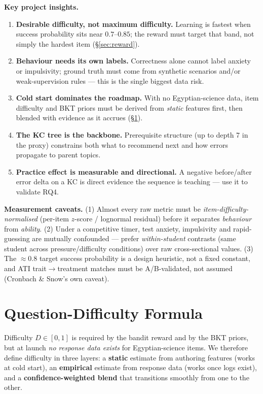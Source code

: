 \documentclass[11pt]{article}
\begin{document}
\medskip
\noindent\textbf{Key project insights.}
\begin{enumerate}[leftmargin=1.4em]
\item \textbf{Desirable difficulty, not maximum difficulty.} Learning is fastest when success probability sits near $0.7$--$0.85$; the reward must target that band, not simply the hardest item (\S\ref{sec:reward}).
\item \textbf{Behaviour needs its own labels.} Correctness alone cannot label anxiety or impulsivity; ground truth must come from synthetic scenarios and/or weak-supervision rules --- this is the single biggest data risk.
\item \textbf{Cold start dominates the roadmap.} With no Egyptian-science data, item difficulty and BKT priors must be derived from \emph{static} features first, then blended with evidence as it accrues (\S\ref{sec:difficulty}).
\item \textbf{The KC tree is the backbone.} Prerequisite structure (up to depth 7 in the proxy) constrains both what to recommend next and how errors propagate to parent topics.
\item \textbf{Practice effect is measurable and directional.} A negative before/after error delta on a KC is direct evidence the sequence is teaching --- use it to validate RQ4.
\end{enumerate}

\noindent\textbf{Measurement caveats.} (1) Almost every raw metric must be \emph{item-difficulty-normalised} (per-item $z$-score / lognormal residual) before it separates \emph{behaviour} from \emph{ability}. (2) Under a competitive timer, test anxiety, impulsivity and rapid-guessing are mutually confounded --- prefer \emph{within-student} contrasts (same student across pressure/difficulty conditions) over raw cross-sectional values. (3) The ${\approx}0.8$ target success probability is a design heuristic, not a fixed constant, and ATI trait$\rightarrow$treatment matches must be A/B-validated, not assumed (Cronbach \& Snow's own caveat).

\section{Question-Difficulty Formula}\label{sec:difficulty}
Difficulty $D\in[0,1]$ is required by the bandit reward and by the BKT priors, but at launch \emph{no response data exists} for Egyptian-science items. We therefore define difficulty in three layers: a \textbf{static} estimate from authoring features (works at cold start), an \textbf{empirical} estimate from response data (works once logs exist), and a \textbf{confidence-weighted blend} that transitions smoothly from one to the other.
\end{document}
